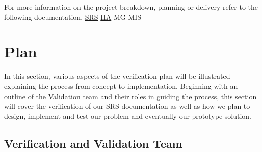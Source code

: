 \documentclass[12pt, titlepage]{article}
\begin{document}
For more information on the project breakdown, planning or delivery refer to the following documentation.
 \href{https://github.com/NevoAbigail/Capstone/blob/main/docs/SRS/SRS.pdf}{SRS}
 \href{https://github.com/NevoAbigail/Capstone/blob/main/docs/HazardAnalysis/HazardAnalysis.pdf}{HA} MG MIS



\section{Plan}

In this section, various aspects of the verification plan will be illustrated explaining the process from concept to implementation. Beginning with an outline of the Validation team and their roles in guiding the process, this section will cover the verification of our SRS documentation as well as how we plan to design, implement and test our problem and eventually our prototype solution.


\subsection{Verification and Validation Team}
\end{document}
